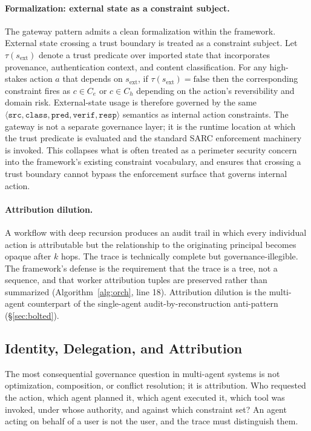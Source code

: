 \documentclass[11pt,a4paper]{article}
\theoremstyle{remark}
\begin{document}
\paragraph{Formalization: external state as a constraint subject.} The gateway pattern admits a clean formalization within the framework. External state crossing a trust boundary is treated as a constraint subject. Let $\tau(s_{\text{ext}})$ denote a trust predicate over imported state that incorporates provenance, authentication context, and content classification. For any high-stakes action $a$ that depends on $s_{\text{ext}}$, if $\tau(s_{\text{ext}}) = \text{false}$ then the corresponding constraint fires as $c \in C_e$ or $c \in C_h$ depending on the action's reversibility and domain risk. External-state usage is therefore governed by the same $\langle \texttt{src}, \texttt{class}, \texttt{pred}, \texttt{verif}, \texttt{resp} \rangle$ semantics as internal action constraints. The gateway is not a separate governance layer; it is the runtime location at which the trust predicate is evaluated and the standard SARC enforcement machinery is invoked. This collapses what is often treated as a perimeter security concern into the framework's existing constraint vocabulary, and ensures that crossing a trust boundary cannot bypass the enforcement surface that governs internal action.

\paragraph{Attribution dilution.} A workflow with deep recursion produces an audit trail in which every individual action is attributable but the relationship to the originating principal becomes opaque after $k$ hops. The trace is technically complete but governance-illegible. The framework's defense is the requirement that the trace is a tree, not a sequence, and that worker attribution tuples are preserved rather than summarized (Algorithm~\ref{alg:orch}, line 18). Attribution dilution is the multi-agent counterpart of the single-agent audit-by-reconstruction anti-pattern (\S\ref{sec:bolted}).

\subsection{Identity, Delegation, and Attribution}\label{sec:attribution}

The most consequential governance question in multi-agent systems is not optimization, composition, or conflict resolution; it is attribution. Who requested the action, which agent planned it, which agent executed it, which tool was invoked, under whose authority, and against which constraint set? An agent acting on behalf of a user is not the user, and the trace must distinguish them.
\end{document}
